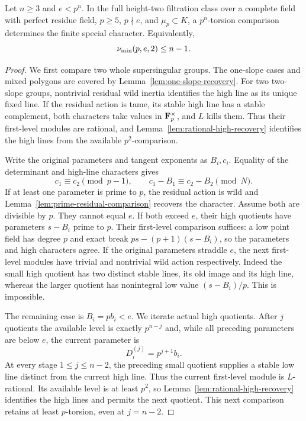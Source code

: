 \begin{theorem}\label{thm:prime-index-upper}
Let $n\ge3$ and $e<p^n$. In the full height-two filtration class over a complete field with perfect residue field, $p\ge5$, $p\nmid e$, and $\mu_p\subset K$, a $p^n$-torsion comparison determines the finite special character. Equivalently,
\[
                         \nu_{\min}(p,e,2)\le n-1.
\]
\end{theorem}
\begin{proof}
We first compare two whole supersingular groups. The one-slope cases and mixed polygons are covered by Lemma~\ref{lem:one-slope-recovery}. For two two-slope groups, nontrivial residual wild inertia identifies the high line as its unique fixed line. If the residual action is tame, its stable high line has a stable complement, both characters take values in $\mathbf F_p^\times$, and $L$ kills them. Thus their first-level modules are rational, and Lemma~\ref{lem:rational-high-recovery} identifies the high lines from the available $p^2$-comparison.

Write the original parameters and tangent exponents as $B_i,c_i$. Equality of the determinant and high-line characters gives
\begin{equation}\label{eq:prime-index-congruences}
 c_1\equiv c_2\pmod{p-1},\qquad
 c_1-B_1\equiv c_2-B_2\pmod N.
\end{equation}
If at least one parameter is prime to $p$, the residual action is wild and Lemma~\ref{lem:prime-residual-comparison} recovers the character. Assume both are divisible by $p$. They cannot equal $e$. If both exceed $e$, their high quotients have parameters $s-B_i$ prime to $p$. Their first-level comparison suffices: a low point field has degree $p$ and exact break $ps-(p+1)(s-B_i)$, so the parameters and high characters agree. If the original parameters straddle $e$, the next first-level modules have trivial and nontrivial wild action respectively. Indeed the small high quotient has two distinct stable lines, its old image and its high line, whereas the larger quotient has nonintegral low value $(s-B_i)/p$. This is impossible.

The remaining case is $B_i=pb_i<e$. We iterate actual high quotients. After $j$ quotients the available level is exactly $p^{n-j}$ and, while all preceding parameters are below $e$, the current parameter is
\[
                         D_i^{(j)}=p^{j+1}b_i.
\]
At every stage $1\le j\le n-2$, the preceding small quotient supplies a stable low line distinct from the current high line. Thus the current first-level module is $L$-rational. Its available level is at least $p^2$, so Lemma~\ref{lem:rational-high-recovery} identifies the high lines and permits the next quotient. This next comparison retains at least $p$-torsion, even at $j=n-2$.


\end{proof}
